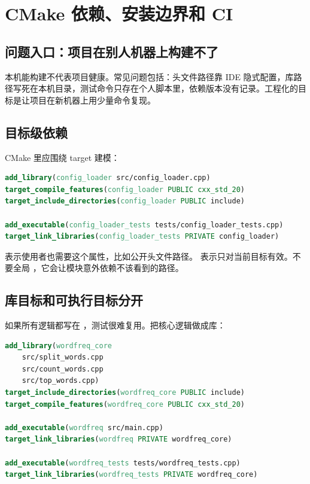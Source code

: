 \chapter{CMake 依赖、安装边界和 CI}

\section{问题入口：项目在别人机器上构建不了}

本机能构建不代表项目健康。常见问题包括：头文件路径靠 IDE 隐式配置，库路径写死在本机目录，测试命令只存在个人脚本里，依赖版本没有记录。工程化的目标是让项目在新机器上用少量命令复现。

\section{目标级依赖}

CMake 里应围绕 target 建模：

\begin{lstlisting}[language=CMake,caption={目标级依赖}]
add_library(config_loader src/config_loader.cpp)
target_compile_features(config_loader PUBLIC cxx_std_20)
target_include_directories(config_loader PUBLIC include)

add_executable(config_loader_tests tests/config_loader_tests.cpp)
target_link_libraries(config_loader_tests PRIVATE config_loader)
\end{lstlisting}

 表示使用者也需要这个属性，比如公开头文件路径。 表示只对当前目标有效。不要全局 ，它会让模块意外依赖不该看到的路径。

\section{库目标和可执行目标分开}

如果所有逻辑都写在 ，测试很难复用。把核心逻辑做成库：

\begin{lstlisting}[language=CMake,caption={库和程序分开}]
add_library(wordfreq_core
    src/split_words.cpp
    src/count_words.cpp
    src/top_words.cpp)
target_include_directories(wordfreq_core PUBLIC include)
target_compile_features(wordfreq_core PUBLIC cxx_std_20)

add_executable(wordfreq src/main.cpp)
target_link_libraries(wordfreq PRIVATE wordfreq_core)

add_executable(wordfreq_tests tests/wordfreq_tests.cpp)
target_link_libraries(wordfreq_tests PRIVATE wordfreq_core)
\end{lstlisting}

